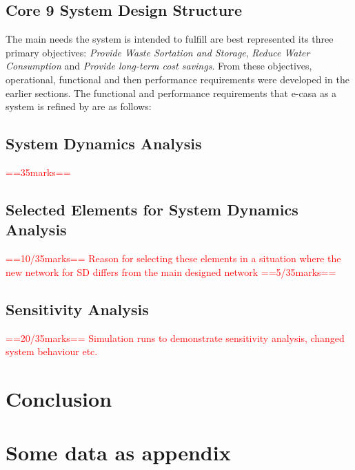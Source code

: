 \documentclass[a4paper,11pt,fleqn]{report}
\begin{document}
\section{Core 9 System Design Structure}
The main needs the system is intended to fulfill are best represented its three primary objectives: \textit{Provide Waste Sortation and Storage}, \textit{Reduce Water Consumption} and \textit{Provide long-term cost savings}. From these objectives, operational, functional and then performance requirements were developed in the earlier sections. The functional and performance requirements that \ac{e-casa} as a system is refined by are as follows:

\section{System Dynamics Analysis}
\textcolor{red}{==35marks==}

\section{Selected Elements for System Dynamics Analysis}
\textcolor{red}{==10/35marks==
Reason for selecting these elements in a situation where the new network for SD differs from the main designed network ==5/35marks==}

\section{Sensitivity Analysis}
\textcolor{red}{==20/35marks==
Simulation runs to demonstrate sensitivity analysis, changed system behaviour etc.}

\chapter{Conclusion}
\acresetall
  


\appendix
\chapter{Some data as appendix}
\end{document}
